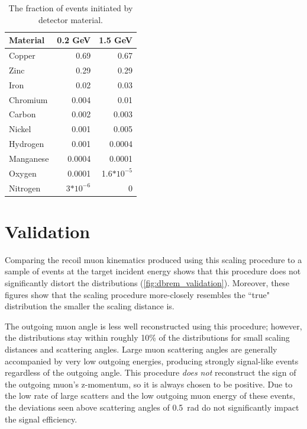 \begin{table}[ht]
    \centering
    \begin{center}
        \begin{tabular}{@{}l rr@{}}
            \toprule
            Material & 0.2 GeV & 1.5 GeV\\
            \midrule
            Copper&0.69&0.67\\
            Zinc&0.29&0.29\\
            Iron&0.02&0.03\\
            Chromium&0.004&0.01\\
            Carbon&0.002&0.003\\
            Nickel&0.001&0.005\\
            Hydrogen&0.001&0.0004\\
            Manganese&0.0004&0.0001\\
            Oxygen&0.0001&1.6$*10^{-5}$\\
            Nitrogen&3$*10^{-6}$&0\\
            \bottomrule
        \end{tabular}
        \caption{
            The fraction of \dbrem events initiated by detector material.
        }
        \label{table:dbrem_material}
    \end{center}
\end{table}
    
\section{Validation}
\label{sec:validation}

Comparing the recoil muon kinematics produced using this scaling procedure to a sample of \mg events at the target incident energy shows that this procedure does not significantly distort the distributions (\cref{fig:dbrem_validation}).
Moreover, these figures show that the scaling procedure more-closely resembles the ``true" \mg distribution the smaller the scaling distance is.

The outgoing muon angle is less well reconstructed using this procedure; however, the distributions stay within roughly 10\% of the \mg distributions for small scaling distances and scattering angles.
Large muon scattering angles are generally accompanied by very low outgoing energies, producing strongly signal-like events regardless of the outgoing angle. 
This procedure \emph{does not} reconstruct the sign of the outgoing muon's z-momentum, so it is always chosen to be positive. 
Due to the low rate of large scatters and the low outgoing muon energy of these events, the deviations seen above scattering angles of \SI{0.5}{\radian} do not significantly impact the signal efficiency.

